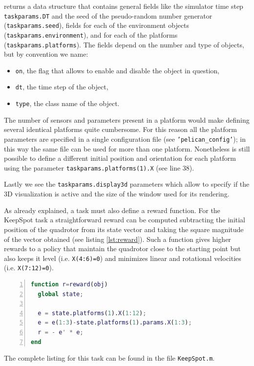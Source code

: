 \documentclass[a4paper,11pt]{report}
\begin{document}
returns a data structure that contains general fields like the simulator time step \texttt{taskparams.DT} and the seed of the pseudo-random number generator (\texttt{taskparams.seed}), fields for each of the environment objects (\texttt{taskparams.environment}), and for each of the platforms (\texttt{taskparams.platforms}). The fields depend on the number and type of objects, but by convention we name:
\begin{itemize}
\item \texttt{on}, the flag that allows to enable and disable the object in question,
\item \texttt{dt}, the time step of the object,
\item \texttt{type}, the class name of the object.
\end{itemize}

The number of sensors and parameters present in a platform would make defining several identical platforms quite cumbersome. For this reason all the platform parameters are specified in a single configuration file (see \texttt{'pelican\_config'}); in this way the same file can be used for more than one platform. Nonetheless is still possible to define a different initial position and orientation for each platform using the parameter \texttt{taskparams.platforms(1).X} (see line 38).

Lastly we see the \texttt{taskparams.display3d} parameters which allow to specify if the 3D visualization is active and the size of the window used for its rendering. 

As already explained, a task must also define a reward function. For the KeepSpot task a straightforward reward can be computed subtracting the initial position of the quadrotor from its state vector and taking the square magnitude of the vector obtained (see listing \ref{lst:reward}). 
Such a function gives higher rewards to a policy that maintain the quadrotor close to the starting point but also keeps it level (i.e. \texttt{X(4:6)=0}) and minimizes linear and rotational velocities (i.e. \texttt{X(7:12)=0}).

\begin{lstlisting}[float=ht!bp,caption=KeepSpot reward() method,language=Matlab,frame=lines,label=lst:reward,numbers=left,basicstyle=\small]
function r=reward(obj)
  global state;

  e = state.platforms(1).X(1:12);
  e = e(1:3)-state.platforms(1).params.X(1:3);
  r = - e' * e; 
end
\end{lstlisting}
The complete listing for this task can be found in the file \texttt{KeepSpot.m}.  
\end{document}
